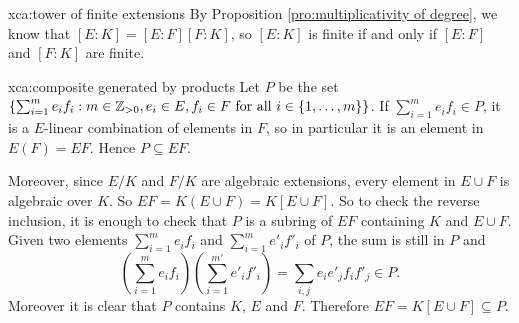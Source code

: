 \begin{sol}{xca:tower of finite extensions}
By Proposition \ref{pro:multiplicativity of degree},
we know that $[E:K]=[E:F][F:K]$, so 
$[E:K]$ is finite if and only if $[E:F]$ and $[F:K]$ are finite.
\end{sol}

\begin{sol}{xca:composite generated by products}
Let $P$ be the set 
$\left\{\sum_{i=1}^me_if_i:m\in\mathbb{Z}_{>0},e_i\in E,f_i\in F\text{ for all $i\in\{1,\dots,m\}$}\right\}$.
If $\sum_{i=1}^me_if_i\in P$, it is a $E$-linear combination
of elements in $F$, so in particular it is an element
in $E(F)=EF$. Hence $P\subseteq EF$.

Moreover, since $E/K$ and $F/K$ are algebraic extensions,
every element in $E\cup F$ is algebraic over $K$.
So $EF=K(E\cup F)=K[E\cup F]$.
So to check the reverse inclusion, 
it is enough to check
that $P$ is a subring of $EF$ containing 
$K$ and $E\cup F$. 
Given two elements 
$\sum_{i=1}^me_if_i$ and $\sum_{i=1}^me'_if'_i$ of $P$, the sum is still in $P$ and 
\[
\left(\sum_{i=1}^me_if_i\right)\left(\sum_{i=1}^{m'}e'_if'_i\right)
=\sum_{i,j}e_ie'_jf_if'_j\in P.
\]
Moreover it is clear that $P$ contains $K$, $E$ and $F$.
Therefore $EF=K[E\cup F]\subseteq P$.
\end{sol}

